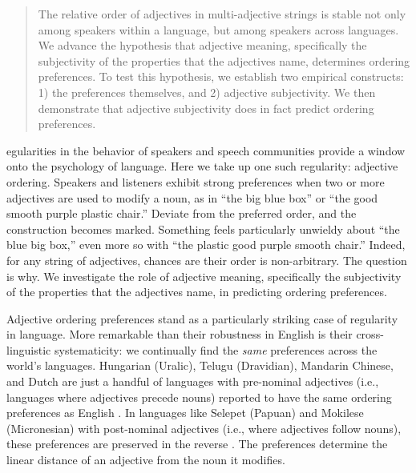 \documentclass{pnastwo}
\begin{document}
\begin{article}
\begin{abstract}
{The relative order of adjectives in multi-adjective strings is stable not only among speakers within a language, but among speakers across languages. We advance the hypothesis that adjective meaning, specifically the subjectivity of the properties that the adjectives name, determines ordering preferences. To test this hypothesis, we establish two empirical constructs: 1) the preferences themselves, and 2) adjective subjectivity. We then demonstrate that adjective subjectivity does in fact predict ordering preferences.}
\end{abstract}



egularities in the behavior of speakers and speech communities provide a window onto the psychology of language. Here we take up one such regularity: adjective ordering. Speakers and listeners exhibit strong preferences when two or more adjectives are used to modify a noun, as in ``the big blue box'' or ``the good smooth purple plastic chair.'' Deviate from the preferred order, and the construction becomes marked. Something feels particularly unwieldy about ``the blue big box,'' even more so with ``the plastic good purple smooth chair.'' Indeed, for any string of adjectives, chances are their order is non-arbitrary. The question is why. We investigate the role of adjective meaning, specifically the subjectivity of the properties that the adjectives name, in predicting ordering preferences.

Adjective ordering preferences stand as a particularly striking case of regularity in language. More remarkable than their robustness in English is their cross-linguistic systematicity: we continually find the \emph{same} preferences across the world's languages. Hungarian (Uralic), Telugu (Dravidian), Mandarin Chinese, and Dutch are just a handful of languages with pre-nominal adjectives (i.e., languages where adjectives precede nouns) reported to have the same ordering preferences as English \cite{dixon1982,sproatshih1991,martin1969competence,hetzron1978,lapollahuang2004}.  In languages like Selepet (Papuan) and Mokilese (Micronesian) with post-nominal adjectives (i.e., where adjectives follow nouns), these preferences are preserved in the reverse \cite{dixon1982,sproatshih1991}. The preferences determine the linear distance of an adjective from the noun it modifies.


\end{article}
\end{document}
